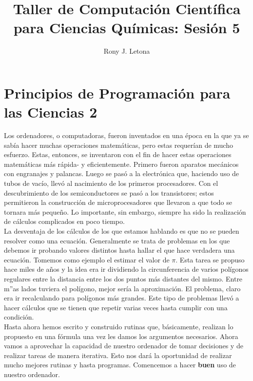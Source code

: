 \documentclass[10pt,letterpaper]{article}
\author{Rony J. Letona}
\title{Taller de Computaci\'on Cient\'ifica para Ciencias Qu\'imicas: Sesi\'on 5}
\begin{document}
\maketitle

\section{Principios de Programaci\'on para las Ciencias 2}
Los ordenadores, o computadoras, fueron inventados en una \'epoca en la que ya se sab\'ia hacer muchas operaciones matem\'aticas, pero estas requer\'ian de mucho esfuerzo. Estas, entonces, se inventaron con el fin de hacer estas operaciones matem\'aticas m\'as r\'apida- y eficientemente. Primero fueron aparatos mec\'anicos con engranajes y palancas. Luego se pas\'o a la electr\'onica que, haciendo uso de tubos de vac\'io, llev\'o al nacimiento de los primeros procesadores. Con el descubrimiento de los semiconductores se pas\'o a los transistores; estos permitieron la construcci\'on de microprocesadores que llevaron a que todo se tornara m\'as peque\~no. Lo importante, sin embargo, siempre ha sido la realizaci\'on de c\'alculos complicados en poco tiempo.\\

La desventaja de los c\'alculos de los que estamos hablando es que no se pueden resolver como una ecuaci\'on. Generalmente se trata de problemas en los que debemos ir probando valores distintos hasta hallar el que hace verdadera una ecuaci\'on. Tomemos como ejemplo el estimar el valor de $\pi$. Esta tarea se propuso hace miles de a\~nos y la idea era ir dividiendo la circunferencia de varios pol\'igonos regulares entre la distancia entre los dos puntos m\'as distantes del mismo. Entre m''as lados tuviera el pol\'igono, mejor ser\'ia la aproximaci\'on. El problema, claro era ir recalculando para pol\'igonos m\'as grandes. Este tipo de problemas llev\'o a hacer c\'alculos que se tienen que repetir varias veces hasta cumplir con una condici\'on.\\

Hasta ahora hemos escrito y construido rutinas que, b\'asicamente, realizan lo propuesto en una f\'ormula una vez les damos los argumentos necesarios. Ahora vamos a aprovechar la capacidad de nuestro ordenador de tomar decisiones y de realizar tareas de manera iterativa. Esto nos dar\'a la oportunidad de realizar mucho mejores rutinas y hasta programas. Comencemos a hacer \textbf{buen} uso de nuestro ordenador.

\pagebreak
\end{document}
